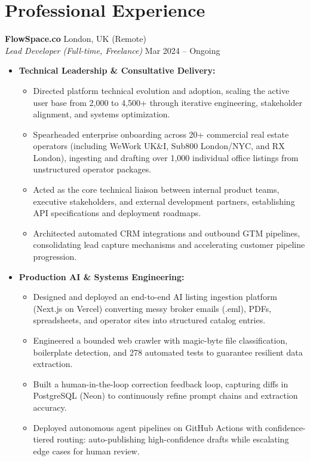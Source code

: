 \documentclass[10pt,a4paper]{article}
\begin{document}
\section*{Professional Experience}

\noindent\textbf{FlowSpace.co} \hfill London, UK (Remote)\\
\textit{Lead Developer (Full-time, Freelance)} \hfill Mar 2024 -- Ongoing
\begin{itemize}
    \item \textbf{Technical Leadership \& Consultative Delivery:}
    \begin{itemize}
        \item Directed platform technical evolution and adoption, scaling the active user base from 2,000 to 4,500+ through iterative engineering, stakeholder alignment, and systems optimization.
        \item Spearheaded enterprise onboarding across 20+ commercial real estate operators (including WeWork UK\&I, Sub800 London/NYC, and RX London), ingesting and drafting over 1,000 individual office listings from unstructured operator packages.
        \item Acted as the core technical liaison between internal product teams, executive stakeholders, and external development partners, establishing API specifications and deployment roadmaps.
        \item Architected automated CRM integrations and outbound GTM pipelines, consolidating lead capture mechanisms and accelerating customer pipeline progression.
    \end{itemize}
    \item \textbf{Production AI \& Systems Engineering:}
    \begin{itemize}
        \item Designed and deployed an end-to-end AI listing ingestion platform (Next.js on Vercel) converting messy broker emails (.eml), PDFs, spreadsheets, and operator sites into structured catalog entries.
        \item Engineered a bounded web crawler with magic-byte file classification, boilerplate detection, and 278 automated tests to guarantee resilient data extraction.
        \item Built a human-in-the-loop correction feedback loop, capturing diffs in PostgreSQL (Neon) to continuously refine prompt chains and extraction accuracy.
        \item Deployed autonomous agent pipelines on GitHub Actions with confidence-tiered routing: auto-publishing high-confidence drafts while escalating edge cases for human review.

\end{itemize}
\end{itemize}
\end{document}
